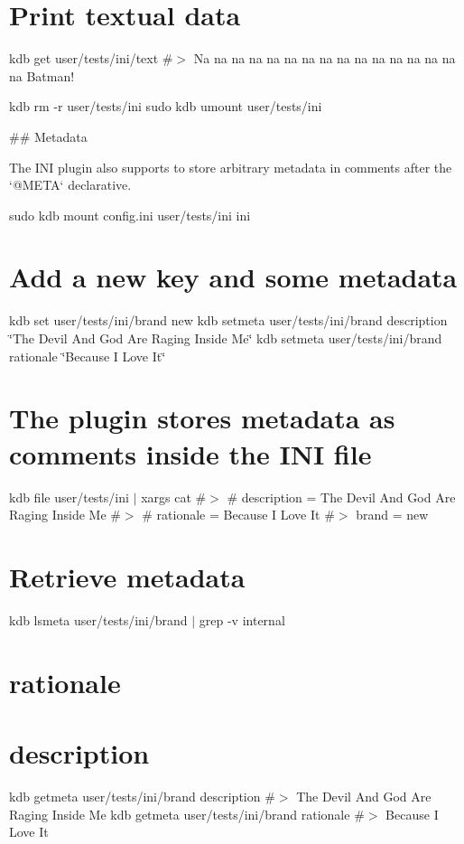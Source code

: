 \section*{Print textual data}

kdb get user/tests/ini/text \#$>$ Na na na na na na na na na na na na na na na na Batman!

kdb rm -\/r user/tests/ini sudo kdb umount user/tests/ini 
\begin{DoxyCode}
## Metadata

The INI plugin also supports to store arbitrary metadata in comments after the `@META` declarative.
\end{DoxyCode}
 sudo kdb mount config.\+ini user/tests/ini ini

\section*{Add a new key and some metadata}

kdb set user/tests/ini/brand new kdb setmeta user/tests/ini/brand description \char`\"{}\+The Devil And God Are Raging Inside Me\char`\"{} kdb setmeta user/tests/ini/brand rationale \char`\"{}\+Because I Love It\char`\"{}

\section*{The plugin stores metadata as comments inside the I\+NI file}

kdb file user/tests/ini $\vert$ xargs cat \#$>$ \# description = The Devil And God Are Raging Inside Me \#$>$ \# rationale = Because I Love It \#$>$ brand = new

\section*{Retrieve metadata}

kdb lsmeta user/tests/ini/brand $\vert$ grep -\/v \textquotesingle{}internal\textquotesingle{} \section*{rationale}

\section*{description}

kdb getmeta user/tests/ini/brand description \#$>$ The Devil And God Are Raging Inside Me kdb getmeta user/tests/ini/brand rationale \#$>$ Because I Love It

